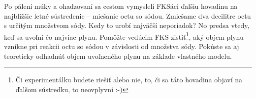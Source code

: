 Po pálení múky a ohadzovaní sa cestom vymysleli FKSáci ďalšiu hovadinu
na najbližšie letné sústredenie -- miešanie octu so sódou. Zmiešame dva
decilitre octu s určitým množstvom sódy. Kedy to urobí najväčší
neporiadok? No predsa vtedy, keď sa uvoľní čo najviac plynu. Pomôžte
vedúcim FKS zistiť\footnote{Či experimentálku budete riešiť alebo nie,
  to, či sa táto hovadina objaví na ďalšom sústredku, to neovplyvní :-)},
aký objem plynu vznikne pri reakcii octu so sódou v závislosti od
množstva sódy. Pokúste sa aj teoreticky odhadnúť objem uvoľneného plynu
na základe vlastného modelu.
